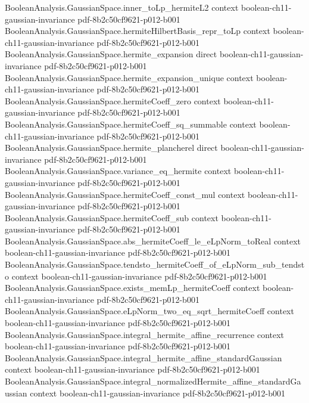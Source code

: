 \begin{theorem}
\proofstep
  {BooleanAnalysis.GaussianSpace.inner_toLp_hermiteL2}
  {context}
  {boolean-ch11-gaussian-invariance}
  {pdf-8b2c50cf9621-p012-b001}
\proofstep
  {BooleanAnalysis.GaussianSpace.hermiteHilbertBasis_repr_toLp}
  {context}
  {boolean-ch11-gaussian-invariance}
  {pdf-8b2c50cf9621-p012-b001}
\proofstep
  {BooleanAnalysis.GaussianSpace.hermite_expansion}
  {direct}
  {boolean-ch11-gaussian-invariance}
  {pdf-8b2c50cf9621-p012-b001}
\proofstep
  {BooleanAnalysis.GaussianSpace.hermite_expansion_unique}
  {context}
  {boolean-ch11-gaussian-invariance}
  {pdf-8b2c50cf9621-p012-b001}
\proofstep
  {BooleanAnalysis.GaussianSpace.hermiteCoeff_zero}
  {context}
  {boolean-ch11-gaussian-invariance}
  {pdf-8b2c50cf9621-p012-b001}
\proofstep
  {BooleanAnalysis.GaussianSpace.hermiteCoeff_sq_summable}
  {context}
  {boolean-ch11-gaussian-invariance}
  {pdf-8b2c50cf9621-p012-b001}
\proofstep
  {BooleanAnalysis.GaussianSpace.hermite_plancherel}
  {direct}
  {boolean-ch11-gaussian-invariance}
  {pdf-8b2c50cf9621-p012-b001}
\proofstep
  {BooleanAnalysis.GaussianSpace.variance_eq_hermite}
  {context}
  {boolean-ch11-gaussian-invariance}
  {pdf-8b2c50cf9621-p012-b001}
\proofstep
  {BooleanAnalysis.GaussianSpace.hermiteCoeff_const_mul}
  {context}
  {boolean-ch11-gaussian-invariance}
  {pdf-8b2c50cf9621-p012-b001}
\proofstep
  {BooleanAnalysis.GaussianSpace.hermiteCoeff_sub}
  {context}
  {boolean-ch11-gaussian-invariance}
  {pdf-8b2c50cf9621-p012-b001}
\proofstep
  {BooleanAnalysis.GaussianSpace.abs_hermiteCoeff_le_eLpNorm_toReal}
  {context}
  {boolean-ch11-gaussian-invariance}
  {pdf-8b2c50cf9621-p012-b001}
\proofstep
  {BooleanAnalysis.GaussianSpace.tendsto_hermiteCoeff_of_eLpNorm_sub_tendsto}
  {context}
  {boolean-ch11-gaussian-invariance}
  {pdf-8b2c50cf9621-p012-b001}
\proofstep
  {BooleanAnalysis.GaussianSpace.exists_memLp_hermiteCoeff}
  {context}
  {boolean-ch11-gaussian-invariance}
  {pdf-8b2c50cf9621-p012-b001}
\proofstep
  {BooleanAnalysis.GaussianSpace.eLpNorm_two_eq_sqrt_hermiteCoeff}
  {context}
  {boolean-ch11-gaussian-invariance}
  {pdf-8b2c50cf9621-p012-b001}
\proofstep
  {BooleanAnalysis.GaussianSpace.integral_hermite_affine_recurrence}
  {context}
  {boolean-ch11-gaussian-invariance}
  {pdf-8b2c50cf9621-p012-b001}
\proofstep
  {BooleanAnalysis.GaussianSpace.integral_hermite_affine_standardGaussian}
  {context}
  {boolean-ch11-gaussian-invariance}
  {pdf-8b2c50cf9621-p012-b001}
\proofstep
  {BooleanAnalysis.GaussianSpace.integral_normalizedHermite_affine_standardGaussian}
  {context}
  {boolean-ch11-gaussian-invariance}
  {pdf-8b2c50cf9621-p012-b001}

\end{theorem}
